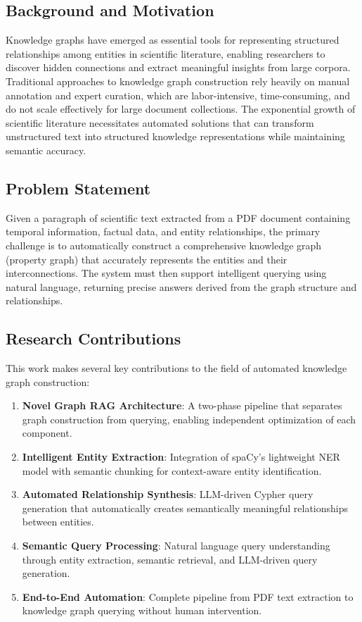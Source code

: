\documentclass[conference]{IEEEtran}
\begin{document}
\subsection{Background and Motivation}
Knowledge graphs have emerged as essential tools for representing structured relationships among entities in scientific literature, enabling researchers to discover hidden connections and extract meaningful insights from large corpora. Traditional approaches to knowledge graph construction rely heavily on manual annotation and expert curation, which are labor-intensive, time-consuming, and do not scale effectively for large document collections. The exponential growth of scientific literature necessitates automated solutions that can transform unstructured text into structured knowledge representations while maintaining semantic accuracy.

\subsection{Problem Statement}
Given a paragraph of scientific text extracted from a PDF document containing temporal information, factual data, and entity relationships, the primary challenge is to automatically construct a comprehensive knowledge graph (property graph) that accurately represents the entities and their interconnections. The system must then support intelligent querying using natural language, returning precise answers derived from the graph structure and relationships.

\subsection{Research Contributions}
This work makes several key contributions to the field of automated knowledge graph construction:

\begin{enumerate}
\item \textbf{Novel Graph RAG Architecture}: A two-phase pipeline that separates graph construction from querying, enabling independent optimization of each component.
\item \textbf{Intelligent Entity Extraction}: Integration of spaCy's lightweight NER model with semantic chunking for context-aware entity identification.
\item \textbf{Automated Relationship Synthesis}: LLM-driven Cypher query generation that automatically creates semantically meaningful relationships between entities.
\item \textbf{Semantic Query Processing}: Natural language query understanding through entity extraction, semantic retrieval, and LLM-driven query generation.
\item \textbf{End-to-End Automation}: Complete pipeline from PDF text extraction to knowledge graph querying without human intervention.
\end{enumerate}
\end{document}
